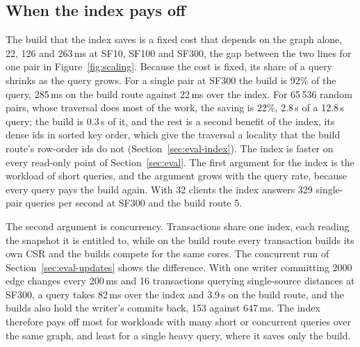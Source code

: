 \subsection{When the index pays off}
\label{sec:index-when}

The build that the index saves is a fixed cost that depends on the graph alone, 22, 126 and 263\,ms at SF10, SF100 and SF300, the gap between the two \duckpgq lines for one pair in Figure~\ref{fig:scaling}. Because the cost
is fixed, its share of a query shrinks as the query grows. For a single pair at SF300 the build is 92\% of the query, 285\,ms on the build route against 22\,ms over the index. For 65\,536 random pairs, whose traversal does most of the work, the saving is 22\%, 2.8\,s of a 12.8\,s query; the build is 0.3\,s of it, and the rest is a second benefit of the index, its dense ids in sorted key order, which give the traversal a locality that the build route's row-order ids do not (Section~\ref{sec:eval-index}). The index is
faster on every read-only point of Section~\ref{sec:eval}. The first argument for the index is the workload of short queries, and the argument grows with the query rate,
because every query pays the build again. With 32 clients the index answers 329 single-pair queries per second at SF300 and the build route 5.

The second argument is concurrency. Transactions share one index, each reading the snapshot it is entitled to,
while on the build route every transaction builds its own CSR and the builds compete for the same cores. The concurrent run of Section~\ref{sec:eval-updates} shows the
difference. With one writer committing 2000 edge changes every 200\,ms and 16 transactions querying single-source
distances at SF300, a query takes 82\,ms over the index and 3.9\,s on the build route, and the builds also hold the writer's commits back, 153 against 647\,ms. The index therefore pays off most for workloads with many short or concurrent queries over the same graph, and
least for a single heavy query, where it saves only the build.


